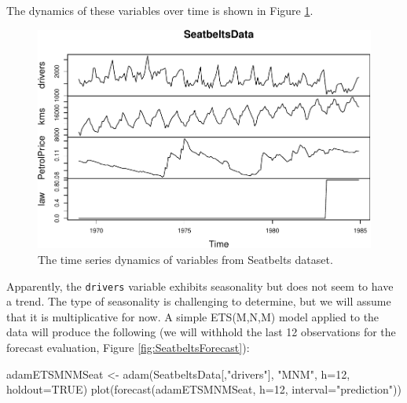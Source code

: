 \documentclass[
]{book}
\newenvironment{Shaded}{\begin{snugshade}}{\end{snugshade}}
\newcommand{\AttributeTok}[1]{\textcolor[rgb]{0.77,0.63,0.00}{#1}}
\newcommand{\ConstantTok}[1]{\textcolor[rgb]{0.00,0.00,0.00}{#1}}
\newcommand{\DecValTok}[1]{\textcolor[rgb]{0.00,0.00,0.81}{#1}}
\newcommand{\FunctionTok}[1]{\textcolor[rgb]{0.00,0.00,0.00}{#1}}
\newcommand{\NormalTok}[1]{#1}
\newcommand{\OtherTok}[1]{\textcolor[rgb]{0.56,0.35,0.01}{#1}}
\newcommand{\StringTok}[1]{\textcolor[rgb]{0.31,0.60,0.02}{#1}}
\theoremstyle{definition}
\theoremstyle{definition}
\theoremstyle{definition}
\theoremstyle{definition}
\theoremstyle{remark}
\begin{document}
The dynamics of these variables over time is shown in Figure \ref{fig:Seatbelts}.

\begin{figure}
\centering
\includegraphics{Svetunkov--2022----ADAM_files/figure-latex/Seatbelts-1.pdf}
\caption{\label{fig:Seatbelts}The time series dynamics of variables from Seatbelts dataset.}
\end{figure}

Apparently, the \texttt{drivers} variable exhibits seasonality but does not seem to have a trend. The type of seasonality is challenging to determine, but we will assume that it is multiplicative for now. A simple ETS(M,N,M) model applied to the data will produce the following (we will withhold the last 12 observations for the forecast evaluation, Figure \ref{fig:SeatbeltsForecast}):

\begin{Shaded}
\begin{Highlighting}[]
\NormalTok{adamETSMNMSeat }\OtherTok{\textless{}{-}} \FunctionTok{adam}\NormalTok{(SeatbeltsData[,}\StringTok{"drivers"}\NormalTok{], }\StringTok{"MNM"}\NormalTok{,}
                       \AttributeTok{h=}\DecValTok{12}\NormalTok{, }\AttributeTok{holdout=}\ConstantTok{TRUE}\NormalTok{)}
\FunctionTok{plot}\NormalTok{(}\FunctionTok{forecast}\NormalTok{(adamETSMNMSeat, }\AttributeTok{h=}\DecValTok{12}\NormalTok{, }\AttributeTok{interval=}\StringTok{"prediction"}\NormalTok{))}
\end{Highlighting}
\end{Shaded}
\end{document}
